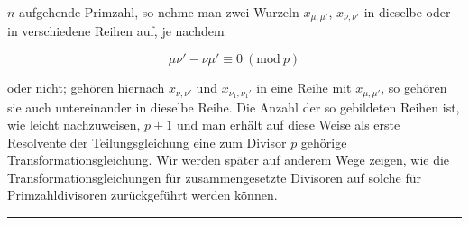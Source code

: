 $n$ aufgehende Primzahl, so nehme man zwei Wurzeln $x_{\mu,\mu'}$, $x_{\nu,\nu'}$
in dieselbe oder in verschiedene Reihen auf, je nachdem

\[
\mu\nu' - \nu\mu' \equiv 0 \ (\mathrm{mod}\ p)
\]

oder nicht; gehören hiernach $x_{\nu,\nu'}$ und $x_{\nu_1,\nu_1'}$ in eine Reihe mit
$x_{\mu,\mu'}$, so gehören sie auch untereinander in dieselbe Reihe. Die
Anzahl der so gebildeten Reihen ist, wie leicht nachzuweisen,
$p + 1$ und man erhält auf diese Weise als erste Resolvente der
Teilungsgleichung eine zum Divisor $p$ gehörige Transformationsgleichung.
Wir werden später auf anderem Wege zeigen, wie die
Transformationsgleichungen für zusammengesetzte Divisoren auf
solche für Primzahldivisoren zurückgeführt werden können.

\begin{center}
\rule{3cm}{0.4pt}
\end{center}
